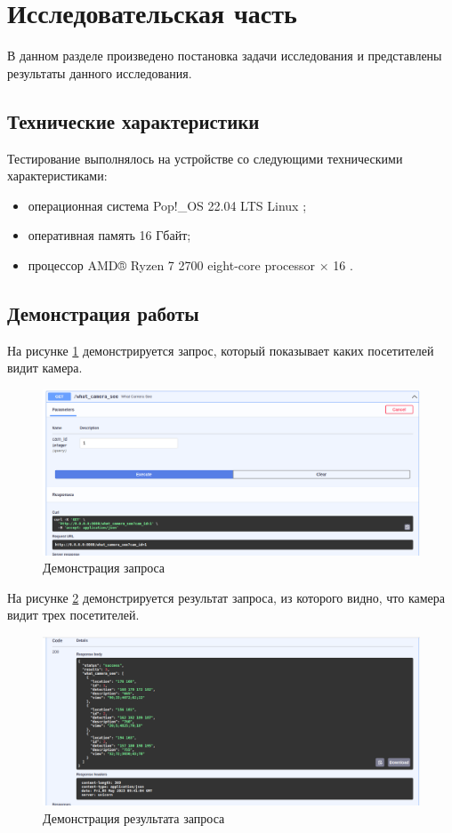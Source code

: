 \section{Исследовательская часть}

В данном разделе произведено постановка задачи исследования и представлены
результаты данного исследования.

\subsection{Технические характеристики}
Тестирование выполнялось на устройстве со следующими техническими
характеристиками:
\begin{itemize}
	\item операционная система Pop!\_OS 22.04 LTS \cite{popos} Linux
	      \cite{Linux};
	\item оперативная память 16 Гбайт;
	\item процессор AMD® Ryzen 7 2700 eight-core processor × 16 \cite{amd}.
\end{itemize}

\subsection{Демонстрация работы}

На рисунке \ref{fig:i:hate:niggers} демонстрируется запрос, который показывает каких посетителей видит камера.


\begin{figure}[ht!]
	\centering
	\includegraphics[width=0.9\linewidth]{assets/images/demon-1-cam.png}
	\caption{Демонстрация запроса}
	\label{fig:i:hate:niggers}
\end{figure}
\FloatBarrier

На рисунке \ref{fig:i:hate:niggers2} демонстрируется результат запроса, из которого видно, что камера видит трех посетителей. 

\begin{figure}[ht!]
	\centering
	\includegraphics[width=0.9\linewidth]{assets/images/demon-2-cam.png}
	\caption{Демонстрация результата запроса}
	\label{fig:i:hate:niggers2}
\end{figure}
\FloatBarrier


